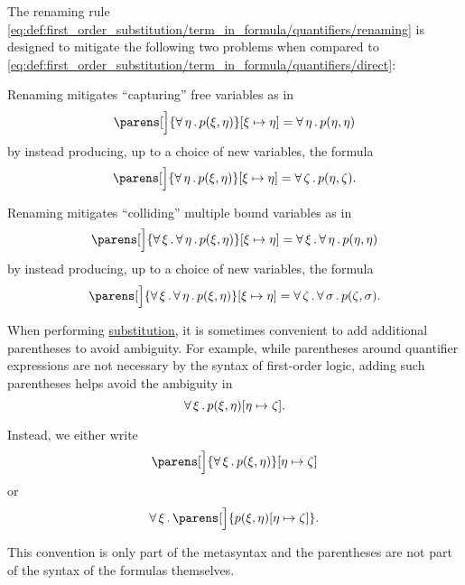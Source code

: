 \begin{remark}\label{rem:first_order_substitution_renaming_justification}
  The renaming rule \eqref{eq:def:first_order_substitution/term_in_formula/quantifiers/renaming} is designed to mitigate the following two problems when compared to \eqref{eq:def:first_order_substitution/term_in_formula/quantifiers/direct}:

  \begin{thmenum}
     Renaming mitigates \enquote{capturing} free variables as in
    \begin{equation*}
      \parens[\Big]{ \qforall \eta p(\xi, \eta) }[\xi \mapsto \eta] = \qforall \eta p(\eta, \eta)
    \end{equation*}
    by instead producing, up to a choice of new variables, the formula
    \begin{equation*}
      \parens[\Big]{ \qforall \eta p(\xi, \eta) }[\xi \mapsto \eta] = \qforall \zeta p(\eta, \zeta).
    \end{equation*}

     Renaming mitigates \enquote{colliding} multiple bound variables as in
    \begin{equation*}
      \parens[\Big]{ \qforall \xi \qforall \eta p(\xi, \eta) }[\xi \mapsto \eta] = \qforall \xi \qforall \eta p(\eta, \eta)
    \end{equation*}
    by instead producing, up to a choice of new variables, the formula
    \begin{equation*}
      \parens[\Big]{ \qforall \xi \qforall \eta p(\xi, \eta) }[\xi \mapsto \eta] = \qforall \zeta \qforall \sigma p(\zeta, \sigma).
    \end{equation*}
  \end{thmenum}
\end{remark}

\begin{remark}\label{rem:first_order_substitution_parentheses}
  When performing \hyperref[def:propositional_substitution]{substitution}, it is sometimes convenient to add additional parentheses to avoid ambiguity. For example, while parentheses around quantifier expressions are not necessary by the syntax of first-order logic, adding such parentheses helps avoid the ambiguity in
  \begin{equation*}
    \forall \thinspace \xi \thinspace . \thinspace p(\xi, \eta) [\eta \mapsto \zeta].
  \end{equation*}

  Instead, we either write
  \begin{equation*}
    \parens[\Big]{ \qforall \xi p(\xi, \eta) } [\eta \mapsto \zeta]
  \end{equation*}
  or
  \begin{equation*}
    \qforall \xi \parens[\Big]{ p(\xi, \eta)[\eta \mapsto \zeta] }.
  \end{equation*}

  This convention is only part of the metasyntax and the parentheses are not part of the syntax of the formulas themselves.
\end{remark}

